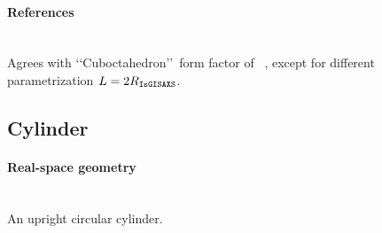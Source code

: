 \paragraph{References}\strut\\
Agrees with \lq\lq Cuboctahedron\rq\rq\ form factor of \IsGISAXS~\cite{Laz02},
except for different parametrization $L=2R_{\rm{\texttt{IsGISAXS}}}$.

\clearpage
\subsection{Cylinder} \label{sec:Cylinder}
 
\paragraph{Real-space geometry}\strut\\
An upright circular cylinder.

\begin{figure}[h]
\hfill
{}
\hfill
{}
\hfill
{}
\hfill
\end{figure}

